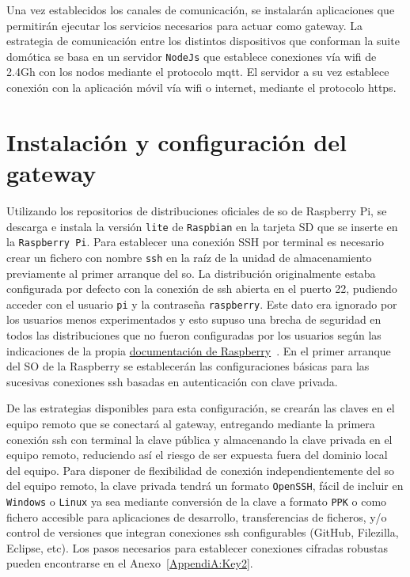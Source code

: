 Una vez establecidos los canales de comunicación, se instalarán aplicaciones que permitirán ejecutar los servicios necesarios para actuar como \gls{gateway}. La estrategia de comunicación entre los distintos dispositivos que conforman la suite domótica se basa en un servidor \verb|NodeJs| que establece conexiones vía \gls{wifi} de 2.4Gh con los nodos mediante el protocolo \gls{mqtt}. El servidor a su vez establece conexión con la aplicación móvil vía \gls{wifi} o internet, mediante el protocolo \gls{https}.

\section{Instalación y configuración del gateway}
\label{ch:Capitulo4.3}
 Utilizando los repositorios de distribuciones oficiales de \gls{so} de Raspberry Pi, se descarga e instala la versión \verb|lite| de \verb|Raspbian| en la tarjeta SD que se inserte en la \verb|Raspberry Pi|. Para establecer una conexión SSH por terminal es necesario crear un fichero con nombre \verb|ssh| en la raíz de la unidad de almacenamiento previamente al primer arranque del \gls{so}. La distribución originalmente estaba configurada por defecto con la conexión de \gls{ssh} abierta en el puerto 22, pudiendo acceder con el usuario \verb|pi| y la contraseña \verb|raspberry|. Este dato era ignorado por los usuarios menos experimentados y esto supuso una brecha de seguridad en todos las distribuciones que no fueron configuradas por los usuarios según las indicaciones de la propia \href{https://www.raspberrypi.org/documentation/configuration/security.md}{documentación de Raspberry}~\cite{securingyourraspberrypi}. En el primer arranque del SO de la Raspberry se establecerán las configuraciones básicas para las sucesivas conexiones \gls{ssh} basadas en autenticación con clave privada.
 
 \vspace{0.5cm}

 De las estrategias disponibles para esta configuración, se crearán las claves en el equipo remoto que se conectará al \gls{gateway}, entregando mediante la primera conexión \gls{ssh} con terminal la clave pública y almacenando la clave privada en el equipo remoto, reduciendo así el riesgo de ser expuesta fuera del dominio local del equipo. Para disponer de flexibilidad de conexión independientemente del \gls{so} del equipo remoto, la clave privada tendrá un formato \verb|OpenSSH|, fácil de incluir en \verb|Windows| o \verb|Linux| ya sea mediante conversión de la clave a formato \verb|PPK| o como fichero accesible para aplicaciones de desarrollo, transferencias de ficheros, y/o control de versiones que integran conexiones \gls{ssh} configurables (GitHub, Filezilla, Eclipse, etc). Los pasos necesarios para establecer conexiones cifradas robustas pueden encontrarse en el Anexo~\ref{AppendiA:Key2}.

